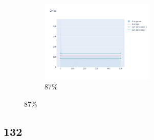 \documentclass[12pt, fleqn]{report}                             %
\theoremstyle{break}                                            %
\begin{document}
\begin{figure}[ht!]
\begin{subfigure}[b]{0.4\linewidth}
          \includegraphics[width=0.6\textwidth]{Images/130/dia-d.png}
          \caption{87\%}
        \end{subfigure}
      \end{figure}


      \clearpage
      \subsection{132}
\end{document}
